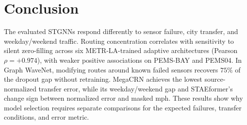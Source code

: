 \section{Conclusion}
\label{sec:conclusion}

The evaluated STGNNs respond differently to sensor failure, city transfer,
and weekday/weekend traffic. Routing concentration correlates with sensitivity
to silent zero-filling across six METR-LA-trained adaptive architectures
(Pearson $\rho{=}{+}0.974$), with weaker positive associations on PEMS-BAY
and PEMS04. In Graph WaveNet, modifying routes around known failed sensors
recovers $75\%$ of the dropout gap without retraining. MegaCRN achieves the
lowest source-normalized transfer error, while its weekday/weekend gap and
STAEformer's change sign between normalized error and masked mph. These
results show why model selection requires separate comparisons for the
expected failures, transfer conditions, and error metric.
